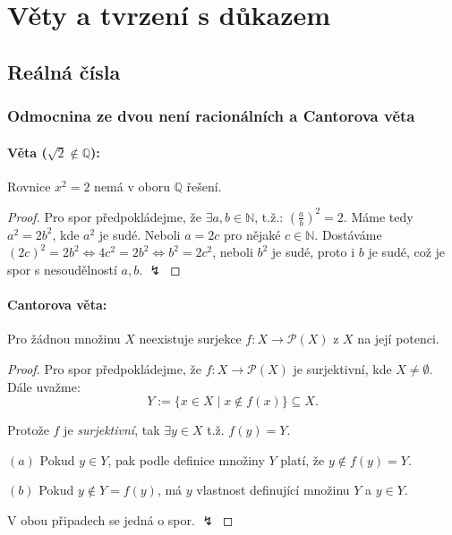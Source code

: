 \documentclass[10pt,a4paper]{article}
\newcommand{\N}{{\mathbb{N}}}
\newcommand{\Q}{{\mathbb{Q}}}
\newcommand{\Pp}{{\mathcal{P}}}
\begin{document}
\newpage

\section{Věty a tvrzení s důkazem}

\subsection{Reálná čísla}

\subsubsection{Odmocnina ze dvou není racionálních a Cantorova věta}

\paragraph*{Věta ($\sqrt{2}\notin \Q$):} Rovnice $x^2 = 2$ nemá v oboru $\Q$ řešení.

\begin{proof}
    Pro spor předpokládejme, že $\exists a,b \in \N$, t.ž.: $\left (\frac ab \right ) ^2 = 2$. 
    Máme tedy $a^2 = 2b^2$, kde $a^2$ je sudé. Neboli $a = 2c$ pro nějaké $c\in \N$.
    Dostáváme $(2c)^2 = 2b^2 \iff 4c^2 = 2b^2 \iff b^2 = 2c^2$,
    neboli $b^2$ je sudé, proto i $b$ je sudé, což je spor s nesoudělností $a,b$. $\lightning$
\end{proof}

\paragraph*{Cantorova věta:} Pro žádnou množinu $X$ neexistuje surjekce $f: X \to \Pp(X)$ z $X$ na její potenci.


\begin{proof}
    Pro spor předpokládejme, že $f:X \to \Pp(X)$ je surjektivní, kde $X \neq \emptyset$. 
    Dále uvažme: \[Y := \{x\in X \mid x \notin f(x)\} \subseteq X.\]

    Protože $f$ je \textit{surjektivní}, tak $\exists y\in X$ t.ž. $f(y) = Y$.
    
    $(a)$ Pokud $y \in Y$, pak podle definice množiny $Y$ platí, že $y \notin f(y) = Y$. 
    
    $(b)$ Pokud $y \notin Y = f(y)$, má $y$ vlastnost definující množinu $Y$ a $y \in Y$. 
    
    V obou připadech se jedná o spor. $\lightning$
\end{proof}
\end{document}
